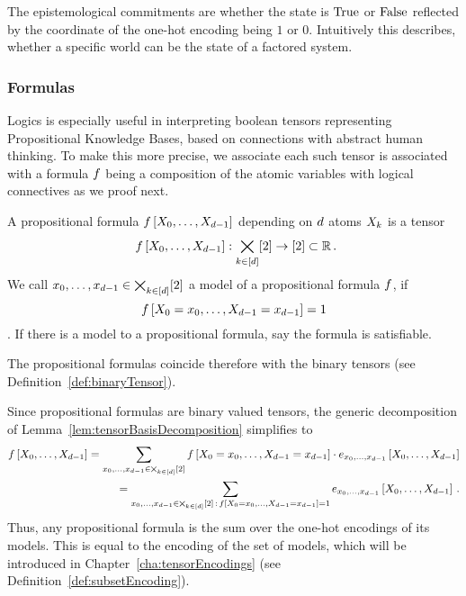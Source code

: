 The epistemological commitments are whether the state is $\mathrm{True}$ or $\mathrm{False}$ reflected by the coordinate of the one-hot encoding being $1$ or $0$.
Intuitively this describes, whether a specific world can be the state of a factored system.

\subsubsection{Formulas}

Logics is especially useful in interpreting boolean tensors representing Propositional Knowledge Bases, based on connections with abstract human thinking.
To make this more precise, we associate each such tensor is associated with a formula $f$ being a composition of the atomic variables with logical connectives as we proof next.

\begin{definition}\label{def:formulas}
	A propositional formula $f\left[X_{0},\ldots,X_{d-1}\right]$ depending on $d$ atoms $X_{k}$ is a tensor
		\[ \formulaat{\catvariables} : \atomstates \rightarrow [2] \subset \rr \, . \]
	We call ${x_{0},\ldots,x_{d-1}} \in \bigtimes_{k\in[d]}[2]$ a model of a propositional formula $f$, if 
		\[ f\left[X_{0}=x_{0},\ldots,X_{d-1}=x_{d-1}\right]=1 \].
	If there is a model to a propositional formula, say the formula is satisfiable.
\end{definition}

The propositional formulas coincide therefore with the binary tensors (see Definition~\ref{def:binaryTensor}).


Since propositional formulas are binary valued tensors, the generic decomposition of Lemma~\ref{lem:tensorBasisDecomposition} simplifies to
\begin{align}\label{eq:formulaModelDecomposition}
	f\left[X_{0},\ldots,X_{d-1}\right] = \sum_{x_{0},\ldots,x_{d-1}\in\bigtimes_{k\in[d]}[2]} f\left[X_{0}=x_{0},\ldots,X_{d-1}=x_{d-1}\right] \cdot e_{x_{0},\ldots,x_{d-1}}\left[X_{0},\ldots,X_{d-1}\right] \\
	= \sum_{x_{0},\ldots,x_{d-1}\in\bigtimes_{k\in[d]}[2] \, : \, f\left[X_{0}=x_{0},\ldots,X_{d-1}=x_{d-1}\right]=1}  e_{x_{0},\ldots,x_{d-1}}\left[X_{0},\ldots,X_{d-1}\right] \, .
\end{align}
Thus, any propositional formula is the sum over the one-hot encodings of its models.
This is equal to the encoding of the set of models, which will be introduced in Chapter~\ref{cha:tensorEncodings} (see Definition~\ref{def:subsetEncoding}).

